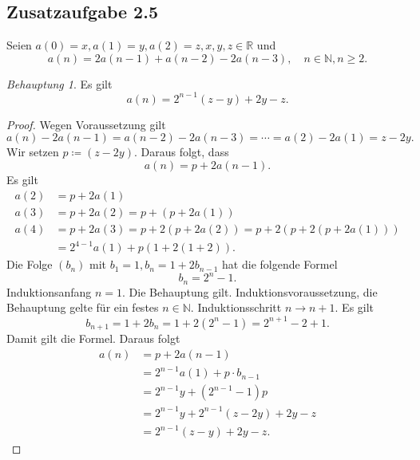 \documentclass[draft,a5paper]{article}
\theoremstyle{remark}
\newtheorem*{Behauptung}{Behauptung}
\begin{document}
\subsection{Zusatzaufgabe 2.5}
Seien \(a(0) = x, a(1) = y, a(2) = z, x,y,z \in \mathbb{R}\) und
\[a(n) = 2a(n-1) + a(n-2) - 2a(n-3), \quad n \in \mathbb{N}, n \ge 2.\]
\begin{Behauptung}
  Es gilt
  \[a(n) = 2^{n-1}(z-y) + 2y -z.\]
\end{Behauptung}
\begin{proof}
  Wegen Voraussetzung gilt
  \[a(n) - 2a(n-1) = a(n-2) - 2a(n-3) = \cdots = a(2) - 2a(1) = z - 2y.\]
  Wir setzen \(p \coloneq (z - 2y)\).  Daraus folgt, dass
  \[a(n) = p + 2a(n-1).\]
  Es gilt
  \begin{align*}
    a(2) &= p + 2a(1) \\
    a(3) &= p + 2a(2) = p + (p + 2a(1)) \\
    a(4) &= p + 2a(3) = p + 2(p + 2a(2)) = p + 2(p + 2(p + 2a(1))) \\
         &= 2^{4-1}a(1) + p(1+2(1+2)).
  \end{align*}
  Die Folge \((b_{n})\) mit \(b_{1} = 1, b_{n} = 1 + 2b_{n-1}\) hat die
  folgende Formel
  \[b_{n} = 2^{n} - 1.\]
  Induktionsanfang \(n = 1\).  Die Behauptung gilt.
  Induktionsvoraussetzung, die Behauptung gelte für ein festes \(n \in
  \mathbb{N}\).  Induktionsschritt \(n \to n+1\).  Es gilt
  \[b_{n+1} = 1 + 2b_{n} = 1 + 2(2^{n} - 1) = 2^{n+1} - 2 + 1.\] Damit
  gilt die Formel.  Daraus folgt
  \begin{align*}
        a(n) &= p + 2a(n-1) \\
         &= 2^{n-1}a(1) + p \cdot b_{n-1} \\
         &= 2^{n-1}y + (2^{n-1} - 1)p \\
         &= 2^{n-1}y + 2^{n-1}(z-2y) + 2y - z \\
         &= 2^{n-1}(z-y) + 2y -z.
  \end{align*}
\end{proof}
\end{document}
